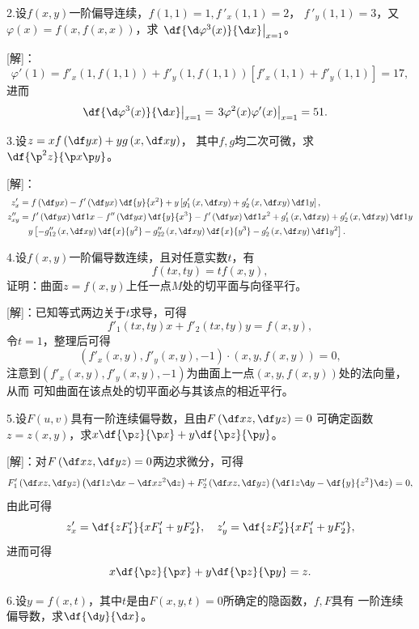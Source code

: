 \bs

2.设$f(x,y)$一阶偏导连续，$f(1,1)=1,f\,'_x(1,1)=2$，
$f\,'_y(1,1)=3$，又$\varphi(x)=f(x,f(x,x))$，求
$\left.\df{\d\varphi^3(x)}{\d x}\right|_{x=1}$。

[解]：
$$\varphi'(1)=f'_x(1,f(1,1))+f'_y(1,f(1,1))[f'_x(1,1)+f'_y(1,1)]
=17,$$
进而
\begin{align*}
	\left.\df{\d\varphi^3(x)}{\d x}\right|_{x=1}
	&=\left.3\varphi^2(x)\varphi'(x)\right|_{x=1}=51.
\end{align*}
\fin

\bs

3.设$z=xf\left(\df yx\right)+yg\left(x,\df xy\right)$，
其中$f,g$均二次可微，求$\df{\p^2 z}{\p x\p y}$。

[解]：
\begin{align*}
	z'_x&=f\left(\df yx\right)-f'\left(\df yx\right)\df{y}{x^2}
	+y\left[g'_1\left(x,\df xy\right)+g'_2\left(x,\df xy\right)\df1y\right],\\
	z''_{xy}&=f'\left(\df yx\right)\df1x
	-f''\left(\df yx\right)\df{y}{x^3}-f'\left(\df yx\right)\df1{x^2}
	+g'_1\left(x,\df xy\right)+g'_2\left(x,\df xy\right)\df1y\\
	&\quad
	y\left[-g''_{12}\left(x,\df xy\right)\df{x}{y^2}-g''_{22}\left(x,\df
	xy\right)\df{x}{y^3}-g'_2\left(x,\df xy\right)\df1{y^2}\right].
\end{align*}
\fin

\bs

4.设$f(x,y)$一阶偏导数连续，且对任意实数$t$，有
$$f(tx,ty)=tf(x,y),$$
证明：曲面$z=f(x,y)$上任一点$M$处的切平面与向径平行。

[解]：已知等式两边关于$t$求导，可得
$$f'_1(tx,ty)x+f'_2(tx,ty)y=f(x,y),$$
令$t=1$，整理后可得
$$(f'_x(x,y),f'_y(x,y),-1)\cdot(x,y,f(x,y))=0,$$
注意到$(f'_x(x,y),f'_y(x,y),-1)$为曲面上一点$(x,y,f(x,y))$处的法向量，从而
可知曲面在该点处的切平面必与其该点的相近平行。\fin

5.设$F(u,v)$具有一阶连续偏导数，且由$F\left(\df xz,\df yz\right)=0$
可确定函数$z=z(x,y)$，求$x\df{\p z}{\p x}+y\df{\p z}{\p y}$。

[解]：对$F\left(\df xz,\df yz\right)=0$两边求微分，可得
$$F'_1\left(\df xz,\df yz\right)\left(\df1z\d x-\df x{z^2}\d z\right)
+F'_2\left(\df xz,\df yz\right)\left(\df1z\d y
-\df{y}{z^2}\d z\right)=0,$$
由此可得
$$
z'_x=\df{zF'_1}{xF'_1+yF'_2},\quad
z'_y=\df{zF'_2}{xF'_1+yF'_2},
$$
进而可得
$$x\df{\p z}{\p x}+y\df{\p z}{\p y}=z.$$
\fin

\bs

6.设$y=f(x,t)$，其中$t$是由$F(x,y,t)=0$所确定的隐函数，$f,F$具有
一阶连续偏导数，求$\df{\d y}{\d x}$。

